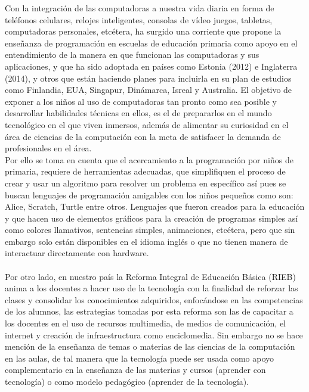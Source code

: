 \documentclass[letterpaper,10pt]{article}
\begin{document}
Con la integración de las computadoras a nuestra vida diaria en forma de teléfonos celulares,
 relojes inteligentes, consolas de vídeo juegos, tabletas, computadoras personales, 
 etcétera, ha surgido una corriente 
que propone la enseñanza de programación en escuelas de educación primaria como apoyo
en el entendimiento de la manera en que funcionan las computadoras y sus aplicaciones, y que ha
sido adoptada en países como Estonia (2012) e Inglaterra (2014), y otros que están 
haciendo planes para incluirla en su plan de estudios como 
Finlandia, EUA, Singapur, Dinámarca, Isreal y Australia. El objetivo de exponer a los niños
al uso de computadoras tan pronto como sea posible y desarrollar habilidades técnicas en ellos,
es el de prepararlos en el mundo tecnológico en el que viven inmersos, además
 de alimentar su curiosidad en el área de ciencias de la computación con la meta de 
 satisfacer la demanda de profesionales en el área.\\ 

Por ello se toma en cuenta que el acercamiento a la programación por niños de primaria, 
requiere de herramientas adecuadas,
que simplifiquen el proceso de crear y usar un algoritmo para resolver un problema en específico 
así pues se buscan lenguajes de programación amigables con los niños pequeños como son:
Alice, Scratch, Turtle entre otros. Lenguajes que fueron creados para la educación y que 
hacen uso de elementos gráficos para la creación de programas simples así como colores llamativos,
sentencias simples, animaciones, etcétera, pero que sin embargo solo están disponibles en el
idioma inglés o que no tienen manera de interactuar directamente con hardware.\\\\

Por otro lado, en nuestro país la Reforma Integral de Educación Básica (RIEB) anima
a los docentes a hacer uso de
la tecnología con la finalidad de reforzar las clases y consolidar los conocimientos adquiridos,
enfocándose en las competencias de los alumnos, las estrategias tomadas por esta reforma son las
de capacitar a los docentes en el uso de recursos multimedia, de medios de comunicación, 
el internet y creación de infraestructura como enciclomedia. Sin embargo no se hace mención 
de la enseñanza de temas o materias de las ciencias de la computación en las aulas, 
de tal manera que la 
tecnología puede ser usada como apoyo complementario en la enseñanza de las materias y cursos 
(aprender con tecnología) o como modelo pedagógico (aprender de la tecnología).\\\\
\end{document}
